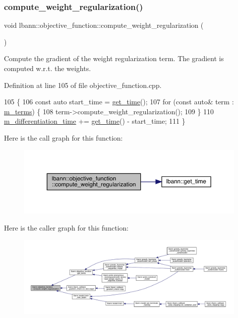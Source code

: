 \subsubsection{\texorpdfstring{compute\+\_\+weight\+\_\+regularization()}{compute\_weight\_regularization()}}
{\footnotesize\ttfamily void lbann\+::objective\+\_\+function\+::compute\+\_\+weight\+\_\+regularization (\begin{DoxyParamCaption}{ }\end{DoxyParamCaption})}

Compute the gradient of the weight regularization term. The gradient is computed w.\+r.\+t. the weights. 

Definition at line 105 of file objective\+\_\+function.\+cpp.


\begin{DoxyCode}
105                                                        \{
106   \textcolor{keyword}{const} \textcolor{keyword}{auto} start\_time = \hyperlink{namespacelbann_a478d36031ff0659893c4322cd856157f}{get\_time}();
107   \textcolor{keywordflow}{for} (\textcolor{keyword}{const} \textcolor{keyword}{auto}& term : \hyperlink{classlbann_1_1objective__function_aea9c1f90ba9af1b1330efa2ba6adb5e2}{m\_terms}) \{
108     term->compute\_weight\_regularization();
109   \}
110   \hyperlink{classlbann_1_1objective__function_ae526559f3a530f540a29407ea64bbea6}{m\_differentiation\_time} += \hyperlink{namespacelbann_a478d36031ff0659893c4322cd856157f}{get\_time}() - start\_time;
111 \}
\end{DoxyCode}
Here is the call graph for this function\+:\nopagebreak
\begin{figure}[H]
\begin{center}
\leavevmode
\includegraphics[width=350pt]{classlbann_1_1objective__function_a7b7f8869bf110846e971fef995db51e1_cgraph}
\end{center}
\end{figure}
Here is the caller graph for this function\+:\nopagebreak
\begin{figure}[H]
\begin{center}
\leavevmode
\includegraphics[width=350pt]{classlbann_1_1objective__function_a7b7f8869bf110846e971fef995db51e1_icgraph}
\end{center}
\end{figure}
